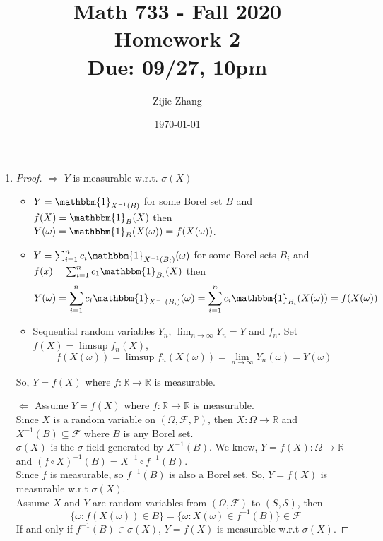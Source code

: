\documentclass{article}
\title{Math 733 - Fall 2020\\
        {\Large \textbf{Homework 2}}\\
        {\normalsize \textbf{Due: 09/27, 10pm}}
    }
\author{Zijie Zhang}
\date{\today}
\begin{document}
    \maketitle
    \begin{enumerate}
        \item \begin{proof}
            $\Rightarrow$ $Y$ is measurable w.r.t. $\sigma(X)$
            \begin{itemize}
                \item $Y=\mathbbm{1}_{X^{-1}(B)}$ for some Borel set $B$ and $f(X)=\mathbbm{1}_{B}(X)$ then $Y(\omega)=\mathbbm{1}_{B}(X(\omega))=f(X(\omega))$.
                \item $Y=\sum_{i=1}^{n}c_i\mathbbm{1}_{X^{-1}(B_i)}(\omega)$ for some Borel sets $B_i$ and $f(x)=\sum_{i=1}^n c_1 \mathbbm{1}_{B_i}(X)$ then
                $$Y(\omega)=\sum_{i=1}^{n}c_i\mathbbm{1}_{X^{-1}(B_i)}(\omega)=\sum_{i=1}^{n} c_i \mathbbm{1}_{B_i}(X(\omega))=f(X(\omega))$$
                \item Sequential random variables $Y_n$, $\lim_{n\to \infty}Y_n=Y$ and $f_n$. Set $f(X)=\limsup{f_n(X)}$,
                $$f(X(\omega))=\limsup{f_n(X(\omega))}=\lim_{n \to \infty}Y_n(\omega)=Y(\omega)$$
            \end{itemize}
            So, $Y=f(X)$ where $f:\mathbb{R}\to \mathbb{R}$ is measurable.

            $\Leftarrow$ Assume $Y=f(X)$ where $f:\mathbb{R}\to \mathbb{R}$ is measurable.\\
            Since $X$ is a random variable on $(\Omega,\mathscr{F},\mathbb{P})$, then
            $X:\Omega \to \mathbb{R}$ and $X^{-1}(B)\subseteq \mathscr{F}$ where $B$ is any Borel set.\\
            $\sigma(X)$ is the $\sigma$-field generated by $X^{-1}(B)$. We know, $Y=f(X):\Omega \to \mathbb{R}$ and $(f\circ X)^{-1}(B)=X^{-1}\circ f^{-1}(B)$.\\
            Since $f$ is measurable, so $f^{-1}(B)$ is also a Borel set.
            So, $Y=f(X)$ is measurable w.r.t $\sigma(X)$.\\


            Assume $X$ and $Y$ are random variables from $\left(\Omega, \mathcal{F}\right)$
            to $(S,\mathcal{S})$, then
            $$\{\omega:f\left(X(\omega)\right)\in B\}
            =\{\omega:X(\omega) \in f^{-1}(B)\}
            \in \mathcal{F}$$
            If and only if $f^{-1}(B) \in \sigma(X)$,
            $Y = f(X)$ is measurable w.r.t $\sigma(X)$.
        \end{proof}


\end{enumerate}
\end{document}
